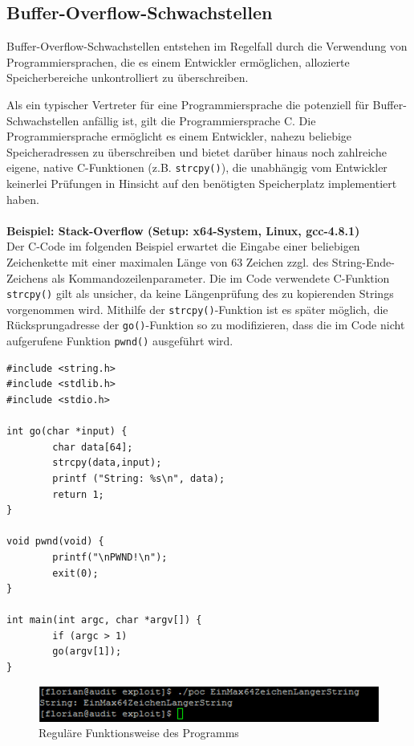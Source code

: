 \newpage
\subsection{Buffer-Overflow-Schwachstellen}	

Buffer-Overflow-Schwachstellen entstehen im Regelfall durch die 
Verwendung von Programmiersprachen, die es einem Entwickler ermöglichen, 
allozierte Speicherbereiche unkontrolliert zu überschreiben.

\par\medskip 
Als ein typischer Vertreter für eine Programmiersprache die potenziell 
für Buffer-Schwachstellen anfällig ist, gilt die Programmiersprache C. 
Die Programmiersprache ermöglicht es einem Entwickler, nahezu beliebige 
Speicheradressen zu überschreiben und bietet darüber hinaus noch 
zahlreiche eigene, native C-Funktionen (z.B. \texttt{strcpy()}), die 
unabhängig vom Entwickler keinerlei Prüfungen in Hinsicht auf den 
benötigten Speicherplatz implementiert haben.
\\\\
\textbf{Beispiel: Stack-Overflow (Setup: x64-System, Linux, gcc-4.8.1)}
\\
Der C-Code im folgenden Beispiel erwartet die Eingabe einer beliebigen 
Zeichenkette mit einer maximalen Länge von 63 Zeichen zzgl. 
des String-Ende-Zeichens als Kommandozeilenparameter. 
Die im Code verwendete C-Funktion \texttt{strcpy()} gilt als unsicher, 
da keine Längenprüfung des zu kopierenden Strings vorgenommen wird. 
Mithilfe der \texttt{strcpy()}-Funktion ist es später möglich, die 
Rücksprungadresse der \texttt{go()}-Funktion so zu modifizieren, dass 
die im Code nicht aufgerufene Funktion \texttt{pwnd()} ausgeführt wird.

\begin{lstlisting}[basicstyle=\ttfamily\footnotesize]
#include <string.h>
#include <stdlib.h>
#include <stdio.h>

int go(char *input) {
        char data[64];
        strcpy(data,input);
        printf ("String: %s\n", data);
        return 1;
}

void pwnd(void) {
        printf("\nPWND!\n");
        exit(0);
}

int main(int argc, char *argv[]) {
        if (argc > 1)
        go(argv[1]);
}
\end{lstlisting}

\begin{figure}[htbp]
 \centering
 \includegraphics[scale=.5]{abbildungen/poc_1}
 \caption{Reguläre Funktionsweise des Programms}
 \label{fig:poc_1} 
\end{figure}

